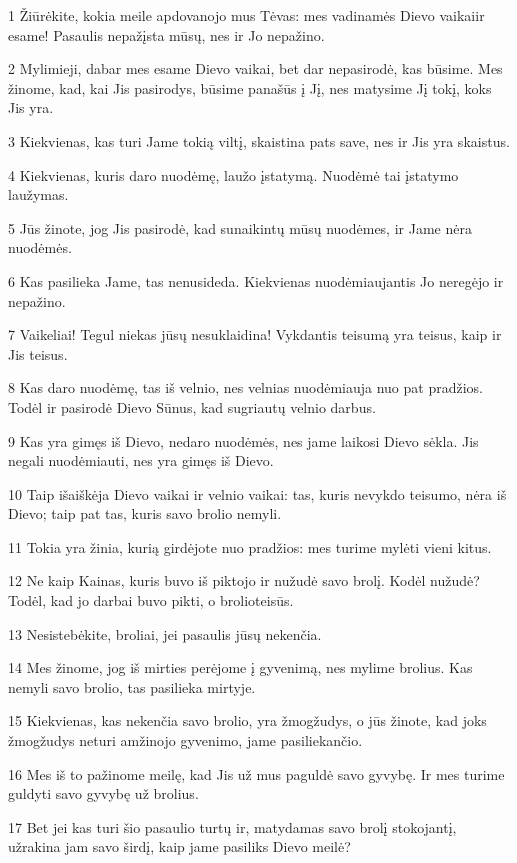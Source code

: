 \par 1 Žiūrėkite, kokia meile apdovanojo mus Tėvas: mes vadinamės Dievo vaikai­ir esame! Pasaulis nepažįsta mūsų, nes ir Jo nepažino. 
\par 2 Mylimieji, dabar mes esame Dievo vaikai, bet dar nepasirodė, kas būsime. Mes žinome, kad, kai Jis pasirodys, būsime panašūs į Jį, nes matysime Jį tokį, koks Jis yra. 
\par 3 Kiekvienas, kas turi Jame tokią viltį, skaistina pats save, nes ir Jis yra skaistus. 
\par 4 Kiekvienas, kuris daro nuodėmę, laužo įstatymą. Nuodėmė­ tai įstatymo laužymas. 
\par 5 Jūs žinote, jog Jis pasirodė, kad sunaikintų mūsų nuodėmes, ir Jame nėra nuodėmės. 
\par 6 Kas pasilieka Jame, tas nenusideda. Kiekvienas nuodėmiaujantis Jo neregėjo ir nepažino. 
\par 7 Vaikeliai! Tegul niekas jūsų nesuklaidina! Vykdantis teisumą yra teisus, kaip ir Jis teisus. 
\par 8 Kas daro nuodėmę, tas iš velnio, nes velnias nuodėmiauja nuo pat pradžios. Todėl ir pasirodė Dievo Sūnus, kad sugriautų velnio darbus. 
\par 9 Kas yra gimęs iš Dievo, nedaro nuodėmės, nes jame laikosi Dievo sėkla. Jis negali nuodėmiauti, nes yra gimęs iš Dievo. 
\par 10 Taip išaiškėja Dievo vaikai ir velnio vaikai: tas, kuris nevykdo teisumo, nėra iš Dievo; taip pat tas, kuris savo brolio nemyli. 
\par 11 Tokia yra žinia, kurią girdėjote nuo pradžios: mes turime mylėti vieni kitus. 
\par 12 Ne kaip Kainas, kuris buvo iš piktojo ir nužudė savo brolį. Kodėl nužudė? Todėl, kad jo darbai buvo pikti, o brolio­teisūs. 
\par 13 Nesistebėkite, broliai, jei pasaulis jūsų nekenčia. 
\par 14 Mes žinome, jog iš mirties perėjome į gyvenimą, nes mylime brolius. Kas nemyli savo brolio, tas pasilieka mirtyje. 
\par 15 Kiekvienas, kas nekenčia savo brolio, yra žmogžudys, o jūs žinote, kad joks žmogžudys neturi amžinojo gyvenimo, jame pasiliekančio. 
\par 16 Mes iš to pažinome meilę, kad Jis už mus paguldė savo gyvybę. Ir mes turime guldyti savo gyvybę už brolius. 
\par 17 Bet jei kas turi šio pasaulio turtų ir, matydamas savo brolį stokojantį, užrakina jam savo širdį,­ kaip jame pasiliks Dievo meilė? 
